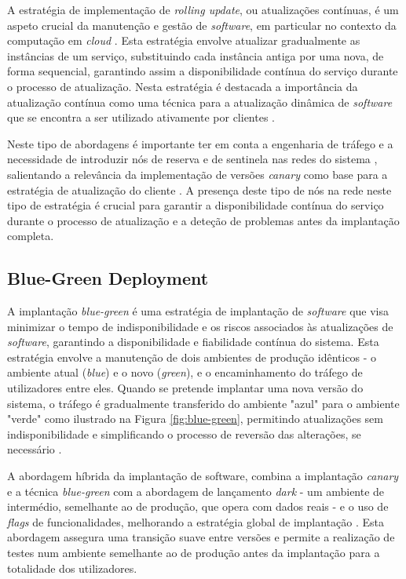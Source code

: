A estratégia de implementação de \textit{rolling update}, ou atualizações contínuas, é um aspeto 
crucial da manutenção e gestão de \textit{software}, em particular no contexto da computação em 
\textit{cloud} \cite{rolling2014}. Esta estratégia envolve atualizar gradualmente as instâncias de 
um serviço, substituindo cada instância antiga por uma nova, de forma sequencial, garantindo assim 
a disponibilidade contínua do serviço durante o processo de atualização. Nesta estratégia é destacada 
a importância da atualização contínua como uma técnica para a atualização dinâmica de \textit{software} 
que se encontra a ser utilizado ativamente por clientes \cite{rolling2014}. 

Neste tipo de abordagens é importante ter em conta a engenharia de tráfego e a necessidade de 
introduzir nós de reserva e de sentinela nas redes do sistema \cite{canary2022}, salientando a 
relevância da implementação de versões \textit{canary} como base para a estratégia de atualização 
do cliente \cite{canary2022}. A presença deste tipo de nós na rede neste tipo de estratégia é 
crucial para garantir a disponibilidade contínua do serviço durante o processo de atualização e a 
deteção de problemas antes da implantação completa.

\subsection{Blue-Green Deployment}

A implantação \textit{blue-green} é uma estratégia de implantação de \textit{software} que visa 
minimizar o tempo de indisponibilidade e os riscos associados às atualizações de \textit{software}, 
garantindo a disponibilidade e fiabilidade contínua do sistema. Esta estratégia envolve a
manutenção de dois ambientes de produção idênticos - o ambiente atual (\textit{blue}) e o novo 
(\textit{green}), e o encaminhamento do tráfego de utilizadores entre eles. Quando se pretende 
implantar uma nova versão do sistema, o tráfego é gradualmente transferido do ambiente "azul" 
para o ambiente "verde" como ilustrado na Figura \ref{fig:blue-green}, permitindo atualizações sem 
indisponibilidade e simplificando o processo de reversão das alterações, se necessário 
\cite{canary2022}.

A abordagem híbrida da implantação de software, combina a implantação \textit{canary} e a técnica 
\textit{blue-green} com a abordagem de lançamento \textit{dark} - um ambiente de intermédio, semelhante
ao de produção, que opera com dados reais - e o uso de \textit{flags} de funcionalidades, 
melhorando a estratégia global de implantação \cite{canary2022}. Esta abordagem assegura uma 
transição suave entre versões e permite a realização de testes num ambiente semelhante ao de 
produção antes da implantação para a totalidade dos utilizadores.

